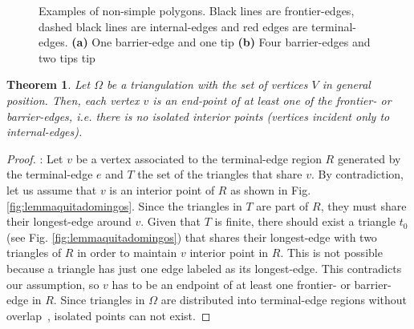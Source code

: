 \documentclass[lineno,pdflatex,sn-mathphys]{sn-jnl}%
\theoremstyle{thmstyleone}%
\newtheorem{theorem}{Theorem}%
\theoremstyle{thmstyletwo}%
\theoremstyle{thmstylethree}%
\begin{document}
\begin{figure}[h]
\centering  
{}\hspace{2cm}
\hspace{0.5cm}

\caption{Examples of non-simple polygons. Black lines are frontier-edges, dashed black lines are internal-edges and red edges are terminal-edges. \textbf{(a)} One barrier-edge and one tip \textbf{(b)} Four barrier-edges and two tips tip }
\label{figs:kindofbarrieredges} 
\end{figure}





\begin{theorem}
\label{D:theoreemvertices}
Let   $\Omega$ be a triangulation with the set of vertices $V$ in general position. Then, each vertex $v$ is an end-point of at least one  of  the  frontier- or barrier-edges, i.e. there is no isolated interior points (vertices incident only to internal-edges).
\end{theorem}

\begin{proof}: Let $v$ be  a vertex  associated to the terminal-edge region $R$ generated by the terminal-edge $e$ and  $T$ the set of the triangles that share $v$. By contradiction, let us assume that $v$ is an interior point of $R$ as shown  in Fig. \ref{fig:lemmaquitadomingos}. Since the triangles in $T$ are part of $R$, they must share their longest-edge around $v$. 
Given that $T$ is finite, there should exist a triangle $t_0$ (see Fig. \ref{fig:lemmaquitadomingos}) that shares their longest-edge with two triangles of $R$ in order to maintain $v$ interior point in $R$. This is not possible because a triangle has just one edge labeled as its  longest-edge. This contradicts our assumption, so $v$ has to be an endpoint of  at least one frontier- or barrier-edge in $R$.  Since triangles in $\Omega$ are distributed into terminal-edge regions without overlap~\cite{Ojeda2018ANA},  isolated points can not exist.
\end{proof}
\end{document}
